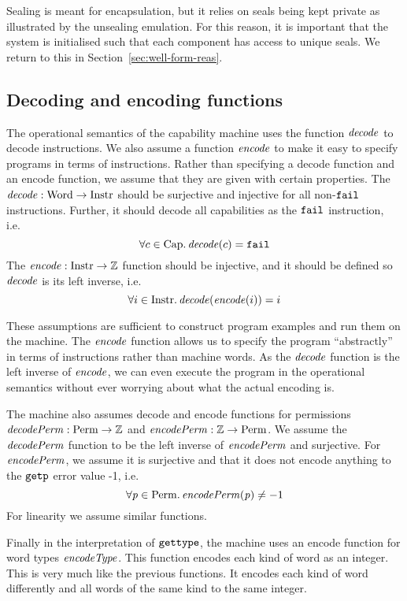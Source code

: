 \documentclass[acmsmall,screen]{acmart}\settopmatter{}
\renewcommand{\decInstr}[1]{\plainfun{decode}{#1}}
\renewcommand{\encInstr}[1]{\plainfun{encode}{#1}}
\renewcommand{\perm}{\var{p}}
\renewcommand{\sectionname}{Section}
\newenvironment{jversion}%
    {\color{OliveGreen}}{}
\begin{document}
\begin{jversion}
  Sealing is meant for encapsulation, but it relies on seals being kept private as illustrated by the unsealing emulation.
  For this reason, it is important that the system is initialised such that each component has access to unique seals.
  We return to this in \sectionname~\ref{sec:well-form-reas}.
\end{jversion}

\begin{jversion}
\subsection{Decoding and encoding functions}
The operational semantics of the capability machine uses the function $\decInstr{}$ to decode instructions.
We also assume a function $\encInstr{}$ to make it easy to specify programs in terms of instructions.
Rather than specifying a decode function and an encode function, we assume that they are given with certain properties.
The $\decInstr{} : \Word \fun \Instr$ should be surjective and injective for all non-$\texttt{{\color{black} fail}}$ instructions.
Further, it should decode all capabilities as the $\texttt{{\color{black} fail}}$ instruction, i.e.\
\[
\forall c \in \Caps \ldotp \decInstr{c} = \fail
\]
The $\encInstr{} : \Instr \fun \ints$ function should be injective, and it should be defined so $\decInstr{}$ is its left inverse, i.e.
\[
\forall i \in \Instr \ldotp \decInstr{}(\encInstr{i}) = i
\]

These assumptions are sufficient to construct program examples and run them on the machine.
The $\encInstr{}$ function allows us to specify the program ``abstractly'' in terms of instructions rather than machine words.
As the $\decInstr{}$ function is the left inverse of $\encInstr{}$, we can even execute the program in the operational semantics without ever worrying about what the actual encoding is.

The machine also assumes decode and encode functions for permissions $\decPerm{} : \Perm \fun \ints$ and $\encPerm{} : \ints \fun \Perm$.
We assume the $\decPerm{}$ function to be the left inverse of $\encPerm{}$ and surjective. For $\encPerm{}$, we assume it is surjective and that it does not encode anything to the $\tgetp{}{}$ error value -1, i.e.
\[
  \forall \perm \in \Perm \ldotp \encPerm{\perm} \neq -1
\]
For linearity we assume similar functions.

Finally in the interpretation of $\tisptr{}{}$, the machine uses an encode function for word types $\encType{}$.
This function encodes each kind of word as an integer.
This is very much like the previous functions.
It encodes each kind of word differently and all words of the same kind to the same integer.
\end{jversion}
\end{document}
